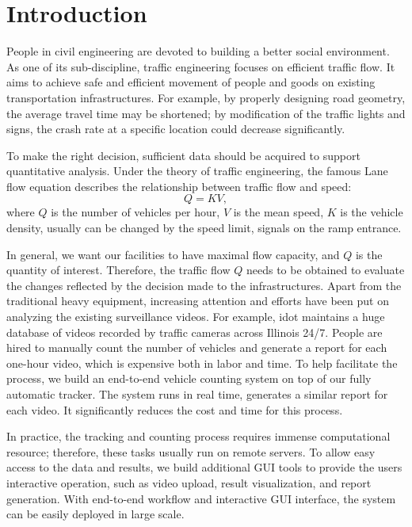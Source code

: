 \section{Introduction}
\label{sec:sys-intro}

People in civil engineering are devoted to building a better social environment.
As one of its sub-discipline, traffic engineering focuses on efficient traffic flow. 
It aims to achieve safe and efficient movement of people and goods on existing transportation infrastructures. 
For example, by properly designing road geometry, the average travel time may be shortened; 
by modification of the traffic lights and signs, the crash rate at a specific location could decrease significantly.

To make the right decision, sufficient data should be acquired to support quantitative analysis.
Under the theory of traffic engineering, the famous Lane flow equation \cite{roess2004traffic} describes the relationship between traffic flow and speed:
$$Q = KV,$$
where $Q$ is the number of vehicles per hour, $V$ is the mean speed, $K$ is the vehicle density, usually can be changed by the speed limit, signals on the ramp entrance. 

In general, we want our facilities to have maximal flow capacity, and $Q$ is the quantity of interest.
Therefore, the traffic flow $Q$ needs to be obtained to evaluate the changes reflected by the decision made to the infrastructures.
Apart from the traditional heavy equipment, increasing attention and efforts have been put on analyzing the existing surveillance videos.
For example, \gls{idot} maintains a huge database of videos recorded by traffic cameras across Illinois 24/7. 
People are hired to manually count the number of vehicles and generate a report for each one-hour video, which is expensive both in labor and time.
To help facilitate the process, we build an end-to-end vehicle counting system on top of our fully automatic tracker. 
The system runs in real time, generates a similar report for each video. It significantly reduces the cost and time for this process.

In practice, the tracking and counting process requires immense computational resource; therefore, these tasks usually run on remote servers. 
To allow easy access to the data and results, we build additional GUI tools to provide the users interactive operation, such as video upload, result visualization, and report generation.
With end-to-end workflow and interactive GUI interface, the system can be easily deployed in large scale.